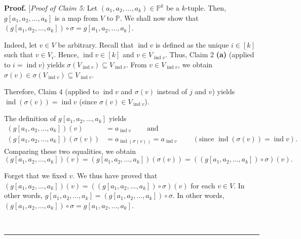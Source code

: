 \documentclass[numbers=enddot,12pt,final,onecolumn,notitlepage]{scrartcl}%
\numberwithin{exer}{section}
\theoremstyle{definition}
\newenvironment{proof}[1][Proof]{\noindent\textbf{#1.} }{\ \rule{0.5em}{0.5em}}
\newenvironment{verlong}{}{}
\begin{document}
\begin{verlong}
\begin{proof}
[\textit{Proof of Claim 5:} Let $\left(  a_{1},a_{2},\ldots,a_{k}\right)
\in\mathbb{P}^{k}$ be a $k$-tuple. Then, $g\left[  a_{1},a_{2},\ldots
,a_{k}\right]  $ is a map from $V$ to $\mathbb{P}$. We shall now show that
$\left(  g\left[  a_{1},a_{2},\ldots,a_{k}\right]  \right)  \circ
\sigma=g\left[  a_{1},a_{2},\ldots,a_{k}\right]  $.

Indeed, let $v\in V$ be arbitrary. Recall that $\operatorname*{ind}v$ is
defined as the unique $i\in\left[  k\right]  $ such that $v\in V_{i}$. Hence,
$\operatorname*{ind}v\in\left[  k\right]  $ and $v\in V_{\operatorname*{ind}%
v}$. Thus, Claim 2 \textbf{(a)} (applied to $i=\operatorname*{ind}v$) yields
$\sigma\left(  V_{\operatorname*{ind}v}\right)  \subseteq
V_{\operatorname*{ind}v}$. From $v\in V_{\operatorname*{ind}v}$, we obtain
$\sigma\left(  v\right)  \in\sigma\left(  V_{\operatorname*{ind}v}\right)
\subseteq V_{\operatorname*{ind}v}$.

Therefore, Claim 4 (applied to $\operatorname*{ind}v$ and $\sigma\left(
v\right)  $ instead of $j$ and $v$) yields $\operatorname*{ind}\left(
\sigma\left(  v\right)  \right)  =\operatorname*{ind}v$ (since $\sigma\left(
v\right)  \in V_{\operatorname*{ind}v}$).

The definition of $g\left[  a_{1},a_{2},\ldots,a_{k}\right]  $ yields%
\begin{align*}
\left(  g\left[  a_{1},a_{2},\ldots,a_{k}\right]  \right)  \left(  v\right)
&  =a_{\operatorname*{ind}v}\ \ \ \ \ \ \ \ \ \ \text{and}\\
\left(  g\left[  a_{1},a_{2},\ldots,a_{k}\right]  \right)  \left(
\sigma\left(  v\right)  \right)   &  =a_{\operatorname*{ind}\left(
\sigma\left(  v\right)  \right)  }=a_{\operatorname*{ind}v}%
\ \ \ \ \ \ \ \ \ \ \left(  \text{since }\operatorname*{ind}\left(
\sigma\left(  v\right)  \right)  =\operatorname*{ind}v\right)  .
\end{align*}
Comparing these two equalities, we obtain%
\[
\left(  g\left[  a_{1},a_{2},\ldots,a_{k}\right]  \right)  \left(  v\right)
=\left(  g\left[  a_{1},a_{2},\ldots,a_{k}\right]  \right)  \left(
\sigma\left(  v\right)  \right)  =\left(  \left(  g\left[  a_{1},a_{2}%
,\ldots,a_{k}\right]  \right)  \circ\sigma\right)  \left(  v\right)  .
\]


Forget that we fixed $v$. We thus have proved that \newline$\left(  g\left[
a_{1},a_{2},\ldots,a_{k}\right]  \right)  \left(  v\right)  =\left(  \left(
g\left[  a_{1},a_{2},\ldots,a_{k}\right]  \right)  \circ\sigma\right)  \left(
v\right)  $ for each $v\in V$. In other words, $g\left[  a_{1},a_{2}%
,\ldots,a_{k}\right]  =\left(  g\left[  a_{1},a_{2},\ldots,a_{k}\right]
\right)  \circ\sigma$. In other words, $\left(  g\left[  a_{1},a_{2}%
,\ldots,a_{k}\right]  \right)  \circ\sigma=g\left[  a_{1},a_{2},\ldots
,a_{k}\right]  $.


\end{proof}
\end{verlong}
\end{document}
